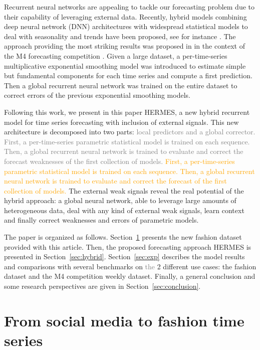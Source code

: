 \documentclass[10pt]{article} %
\begin{document}
Recurrent neural networks are appealing to tackle our forecasting problem due to their capability of leveraging external data.  Recently, hybrid models combining deep neural network (DNN) architectures with widespread statistical models to deal with seasonality and trends have been proposed, see for instance  \citet{zhang2003,jianwei2019,bandara2020}. The approach providing the most striking results was proposed in  \citet{smyl2020} in the context of the M4 forecasting competition \citep{makridakis2020}.  Given a large dataset, a per-time-series multiplicative exponential smoothing model was introduced to estimate simple but fundamental components for each time series and compute a first prediction. Then a global recurrent neural network was trained on the entire dataset to correct errors of the previous exponential smoothing models. 

Following this work, we present in this paper HERMES, a new hybrid recurrent model for time series forecasting with inclusion of external signals. This new architecture is decomposed  into two parts: \textcolor{gray}{local predictors and a global corrector. First, a per-time-series parametric statistical model is trained on each sequence. Then, a global recurrent neural network is trained to evaluate and correct the forecast weaknesses of the first collection of models.} \textcolor{orange}{First, a per-time-series parametric statistical model is trained on each sequence. Then, a global recurrent neural network is trained to evaluate and correct the forecast of the first collection of models.} The external weak signals reveal the real potential of the hybrid approach: a global neural network, able to leverage large amounts of heterogeneous data, deal with any kind of external weak signals, learn context and finally correct weaknesses and errors of parametric models.

The paper is organized as follows. Section~\ref{sec:dataset} presents the new fashion dataset provided with this article. Then, the proposed forecasting approach HERMES is presented in Section~\ref{sec:hybrid}. Section~\ref{sec:exp} describes the model results and comparisons with several benchmarks on \textcolor{gray}{the} 2 different use cases: the fashion dataset and the M4 competition weekly dataset. Finally, a general conclusion and some research perspectives are given in  Section~\ref{sec:conclusion}.

\section{From social media to fashion time series}
\label{sec:dataset}
\end{document}
